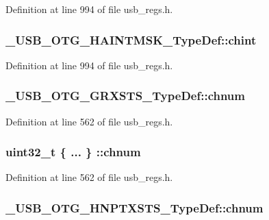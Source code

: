 Definition at line 994 of file usb\-\_\-regs.\-h.

\hypertarget{group___u_s_b___o_t_g___d_r_i_v_e_r_ga156b3c134342527fb279cc80d1a79276}{
\subsubsection[{chint}]{ \-\_\-\-U\-S\-B\-\_\-\-O\-T\-G\-\_\-\-H\-A\-I\-N\-T\-M\-S\-K\-\_\-\-Type\-Def\-::chint}}\label{group___u_s_b___o_t_g___d_r_i_v_e_r_ga156b3c134342527fb279cc80d1a79276}


Definition at line 994 of file usb\-\_\-regs.\-h.

\hypertarget{group___u_s_b___o_t_g___d_r_i_v_e_r_gad13bf9b9a5b51b6001dc3b898a936845}{
\subsubsection[{chnum}]{ \-\_\-\-U\-S\-B\-\_\-\-O\-T\-G\-\_\-\-G\-R\-X\-S\-T\-S\-\_\-\-Type\-Def\-::chnum}}\label{group___u_s_b___o_t_g___d_r_i_v_e_r_gad13bf9b9a5b51b6001dc3b898a936845}


Definition at line 562 of file usb\-\_\-regs.\-h.

\hypertarget{group___u_s_b___o_t_g___d_r_i_v_e_r_gac2046cab6ba7763be5573ed3d6b7dfa1}{
\subsubsection[{chnum}]{\setlength{\rightskip}{0pt plus 5cm}uint32\-\_\-t \{ ... \} \-::chnum}}\label{group___u_s_b___o_t_g___d_r_i_v_e_r_gac2046cab6ba7763be5573ed3d6b7dfa1}


Definition at line 562 of file usb\-\_\-regs.\-h.

\hypertarget{group___u_s_b___o_t_g___d_r_i_v_e_r_gaa358189a93a955a21e5b3cfdb0b1a08d}{
\subsubsection[{chnum}]{ \-\_\-\-U\-S\-B\-\_\-\-O\-T\-G\-\_\-\-H\-N\-P\-T\-X\-S\-T\-S\-\_\-\-Type\-Def\-::chnum}}\label{group___u_s_b___o_t_g___d_r_i_v_e_r_gaa358189a93a955a21e5b3cfdb0b1a08d}


